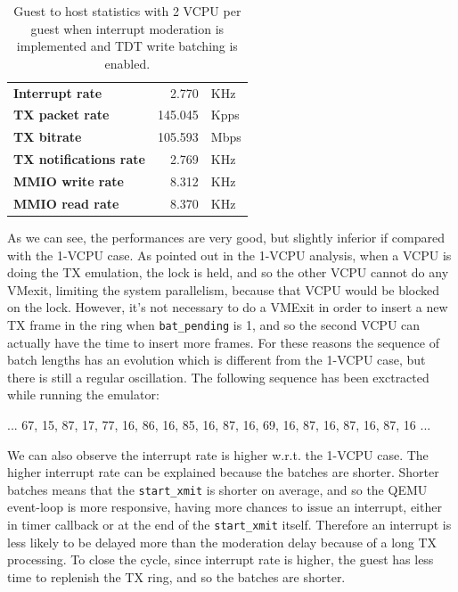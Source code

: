 \begin{table}
\begin{center}
\begin{tabular}{lrl}
\toprule
\textbf{Interrupt rate} & 2.770 & KHz\\
\textbf{TX packet rate} & 145.045 & Kpps\\
\textbf{TX bitrate} & 105.593 & Mbps\\
\textbf{TX notifications rate} & 2.769 & KHz\\
\textbf{MMIO write rate} & 8.312 & KHz\\
\textbf{MMIO read rate} & 8.370 & KHz\\
\bottomrule
\end{tabular}
\end{center}
\caption{Guest to host statistics with 2 VCPU per guest when interrupt moderation is implemented and TDT write batching is enabled.}
\label{tab:e1000-mit-bat-tx-g2h2vcpu}
\end{table}

As we can see, the performances are very good, but slightly inferior if compared with the 1-VCPU case.
As pointed out in the 1-VCPU analysis, when a VCPU is doing the TX emulation, the lock is held, and so the other VCPU cannot do any VMexit,
limiting the system parallelism, because that VCPU would be blocked on the lock. However, it's not necessary to do a VMExit in order to 
insert a new TX frame in the ring when \texttt{bat\_pending} is 1, and so the second VCPU can actually have the time to insert more
frames. For these reasons the sequence of batch lengths has an evolution which is different from the 1-VCPU case, but there is still  a 
regular oscillation. The following sequence has been exctracted while running the emulator:
\begin{center}
... 67, 15, 87, 17, 77, 16, 86, 16, 85, 16, 87, 16, 69, 16, 87, 16, 87, 16, 87, 16 ...
\end{center}
We can also observe the interrupt rate is higher w.r.t. the 1-VCPU case. The higher interrupt rate can be explained because the batches
are shorter. Shorter batches means that the \texttt{start\_xmit} is shorter on average, and so the QEMU event-loop is more responsive,
having more chances to issue an interrupt, either in timer callback or at the end of the \texttt{start\_xmit} itself. Therefore an
interrupt is less likely to be delayed more than the moderation delay because of a long TX processing.
To close the cycle, since interrupt rate is higher, the guest has less time to replenish the TX ring, and so the batches are shorter.

